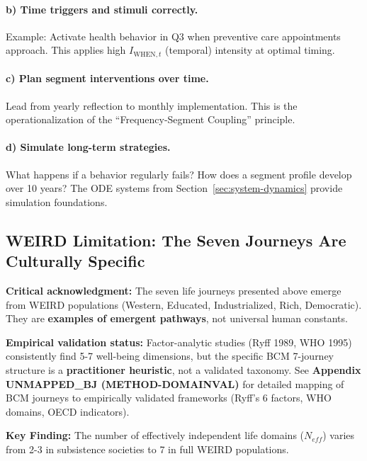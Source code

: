 {{{\paragraph{b) Time triggers and stimuli correctly.}
Example: Activate health behavior in Q3 when preventive care appointments approach. This applies high $I_{\text{WHEN},t}$ (temporal) intensity at optimal timing.

\paragraph{c) Plan segment interventions over time.}
Lead from yearly reflection to monthly implementation. This is the operationalization of the ``Frequency-Segment Coupling'' principle.

\paragraph{d) Simulate long-term strategies.}
What happens if a behavior regularly fails? How does a segment profile develop over 10 years? The ODE systems from Section~\ref{sec:system-dynamics} provide simulation foundations.

\subsection{WEIRD Limitation: The Seven Journeys Are Culturally Specific}
\label{sec:weird-limitation}

\textbf{Critical acknowledgment:} The seven life journeys presented above emerge from WEIRD populations (Western, Educated, Industrialized, Rich, Democratic). They are \textbf{examples of emergent pathways}, not universal human constants.

\textbf{Empirical validation status:} Factor-analytic studies (Ryff 1989, WHO 1995) consistently find 5-7 well-being dimensions, but the specific BCM 7-journey structure is a \textbf{practitioner heuristic}, not a validated taxonomy. See \textbf{Appendix UNMAPPED_BJ (METHOD-DOMAINVAL)} for detailed mapping of BCM journeys to empirically validated frameworks (Ryff's 6 factors, WHO domains, OECD indicators).

\begin{tcolorbox}[colback=blue!5!white, colframe=blue!75!black, title=N$_{eff}$ Spectrum: Cross-Cultural Domain Validation (from Appendix UNMAPPED_BJ)]

\textbf{Key Finding:} The number of effectively independent life domains ($N_{eff}$) varies from 2-3 in subsistence societies to 7 in full WEIRD populations.


\end{tcolorbox}}}}
